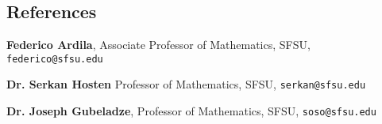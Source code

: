 \documentclass[margin,line,pifont,palatino,courier]{res}
\newenvironment{list1}{
  \begin{list}{\label{}}{%
      \setlength{\itemsep}{0in}
      \setlength{\parsep}{0in} \setlength{\parskip}{0in}
      \setlength{\topsep}{0in} \setlength{\partopsep}{0in}
      \setlength{\leftmargin}{0.0in}}}{\end{list}}
\begin{document}
\begin{resume}
\section{\sc   References}

\begin{list1}
\item {\bf Federico Ardila}, Associate Professor of Mathematics, SFSU, \texttt{federico@sfsu.edu}

\item {\bf Dr. Serkan Hosten}  Professor of Mathematics, SFSU, \texttt{serkan@sfsu.edu} 

\item {\bf Dr. Joseph Gubeladze},  Professor of Mathematics,  SFSU, \texttt{soso@sfsu.edu} 
\end{list1}


\end{resume}
\end{document}
